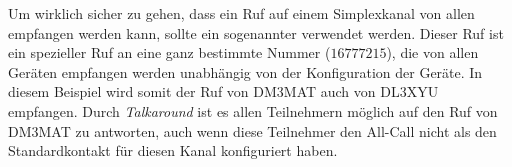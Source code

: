 Um wirklich sicher zu gehen, dass ein Ruf auf einem Simplexkanal von allen empfangen werden kann, sollte ein sogenannter  verwendet werden. Dieser Ruf ist ein spezieller Ruf an eine ganz bestimmte Nummer ($16777215$), die von allen Geräten empfangen werden unabhängig von der Konfiguration der Geräte. In diesem Beispiel wird somit der Ruf von DM3MAT auch von DL3XYU empfangen. Durch \emph{Talkaround} ist es allen Teilnehmern möglich auf den Ruf von DM3MAT zu antworten, auch wenn diese Teilnehmer den All-Call nicht als den Standardkontakt für diesen Kanal konfiguriert haben. 

